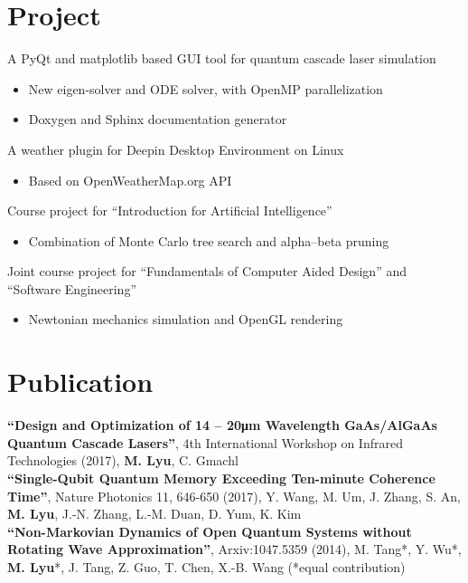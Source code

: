 \documentclass[11pt,letterpaper]{resume}
\begin{document}
\section{Project}
A PyQt and matplotlib based GUI tool for quantum cascade laser simulation
\begin{itemize}
    \item New eigen-solver and ODE solver, with OpenMP parallelization
    \item Doxygen and Sphinx documentation generator
\end{itemize}\medskip

A weather plugin for Deepin Desktop Environment on Linux
\begin{itemize}
    \item Based on OpenWeatherMap.org API
\end{itemize}\medskip

Course project for ``Introduction for Artificial Intelligence''
\begin{itemize}
    \item Combination of Monte Carlo tree search and alpha–beta pruning
\end{itemize}\medskip

Joint course project for ``Fundamentals of Computer Aided Design'' and 
``Software Engineering''
\begin{itemize}
    \item Newtonian mechanics simulation and OpenGL rendering
\end{itemize}

\section{Publication}
\textbf{``Design and Optimization of 14 -- 20\si{\micro m} Wavelength 
GaAs/AlGaAs Quantum Cascade Lasers''}, 
4th International Workshop on Infrared Technologies (2017), 
\textbf{M. Lyu}, C. Gmachl \\
\textbf{``Single-Qubit Quantum Memory Exceeding Ten-minute Coherence Time''}, 
Nature Photonics 11, 646-650 (2017), Y. Wang, M. Um, J. Zhang, S. An, 
\textbf{M. Lyu}, J.-N. Zhang, L.-M. Duan, D. Yum, K. Kim \\
\textbf{``Non-Markovian Dynamics of Open Quantum Systems without Rotating 
Wave Approximation''}, 
Arxiv:1047.5359 (2014), 
M. Tang*, Y. Wu*, \textbf{M. Lyu}*, J. Tang, Z. Guo, T. Chen, X.-B. Wang  
(*equal contribution)
\end{document}
